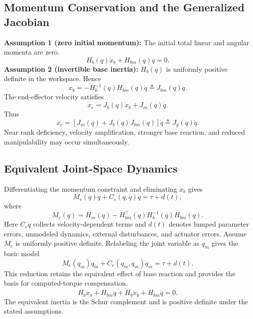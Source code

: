 \subsection{Momentum Conservation and the Generalized Jacobian}
\noindent\textbf{Assumption 1 (zero initial momentum):} The initial total linear and angular momenta are zero.
\begin{equation}H_b(q)\dot x_b+H_{bm}(q)\dot q=0.\label{eq:momentum_constraint}\end{equation}
\noindent\textbf{Assumption 2 (invertible base inertia):} $H_b(q)$ is uniformly positive definite in the workspace. Hence
\begin{equation}\dot x_b=-H_b^{-1}(q)H_{bm}(q)\dot q\triangleq J_{bm}(q)\dot q.\label{eq:base_joint_jacobian}\end{equation}
The end-effector velocity satisfies
\begin{equation}\dot x_e=J_b(q)\dot x_b+J_m(q)\dot q.\label{eq:end_velocity_common}\end{equation}
Thus
\begin{equation}\dot x_e=[J_m(q)+J_b(q)J_{bm}(q)]\dot q\triangleq J_g(q)\dot q.\label{eq:generalized_jacobian}\end{equation}
Near rank deficiency, velocity amplification, stronger base reaction, and reduced manipulability may occur simultaneously.
\subsection{Equivalent Joint-Space Dynamics}
Differentiating the momentum constraint and eliminating $\ddot x_b$ gives
\begin{equation}M_e(q)\ddot q+C_e(q,\dot q)\dot q=\tau+d(t),\label{eq:joint_model}\end{equation}
where
\begin{equation}M_e(q)=H_m(q)-H_{bm}^\top(q)H_b^{-1}(q)H_{bm}(q).\label{eq:generalized_inertia}\end{equation}
Here $C_e\dot q$ collects velocity-dependent terms and $d(t)$ denotes lumped parameter errors, unmodeled dynamics, external disturbances, and actuator errors. Assume $M_e$ is uniformly positive definite. Relabeling the joint variable as $q_m$ gives the basic model
\begin{equation}M_e(q_m)\ddot q_m+C_e(q_m,\dot q_m)\dot q_m=\tau+d(t).\label{eq:joint_model_relabelled}\end{equation}
This reduction retains the equivalent effect of base reaction and provides the basis for computed-torque compensation.
\begin{equation}H_b\ddot x_b+H_{bm}\ddot q+\dot H_b\dot x_b+\dot H_{bm}\dot q=0.\label{eq:momentum_derivative}\end{equation}
The equivalent inertia is the Schur complement and is positive definite under the stated assumptions.

